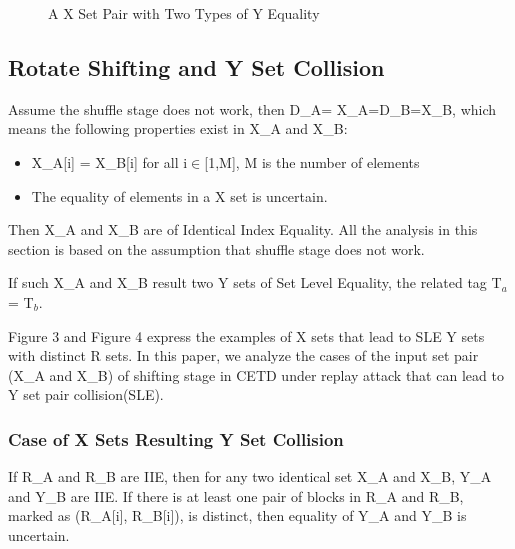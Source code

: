 \documentclass{article}
\begin{document}
\begin{figure}
\centering
{}
\caption{A X Set Pair with Two Types of Y Equality}
 \label{fig:y_both} %
\end{figure}

\subsection{Rotate Shifting and Y Set Collision} 
Assume the shuffle stage does not work, then D\_A= X\_A=D\_B=X\_B, which means the following properties exist in X\_A and X\_B:
\begin{itemize}
	\item X\_A[i] = X\_B[i] for all i$\in$[1,M], M is the number of elements
	\item The equality of elements in a X set is uncertain.
\end{itemize}
Then X\_A and X\_B are of Identical Index Equality. 
All the analysis in this section is based on the assumption that shuffle stage does not work.

If such X\_A and X\_B result two Y sets of Set Level Equality, the related tag T$_a$ = T$_b$.
 
Figure 3 and Figure 4 express the examples of X sets that lead to SLE Y sets with distinct R sets. In this paper, we analyze the cases of the input set pair (X\_A and X\_B) of shifting stage in CETD under replay attack that can lead to Y set pair collision(SLE).



\subsubsection{Case of X Sets Resulting Y Set Collision}
If R\_A and R\_B are IIE, then for any two identical set X\_A and X\_B, Y\_A and Y\_B are IIE. If there is at least one pair of blocks in R\_A and R\_B, marked as (R\_A[i], R\_B[i]), is distinct, then equality of Y\_A and Y\_B is uncertain.
\end{document}
